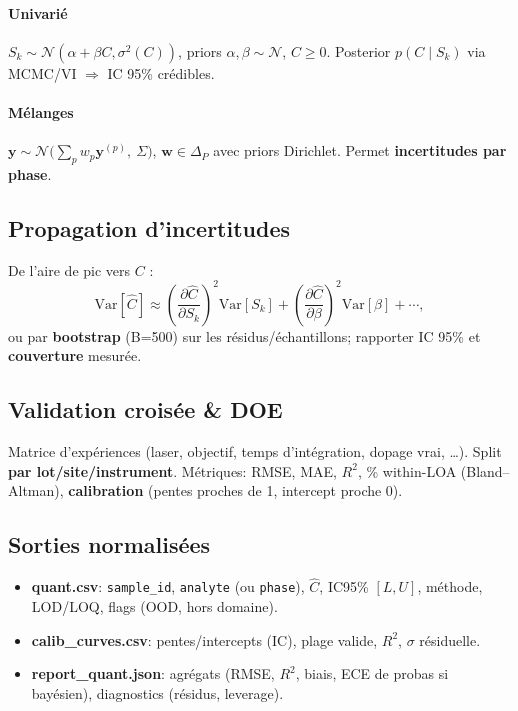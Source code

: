 \paragraph{Univarié} $S_k \sim \mathcal{N}(\alpha + \beta C, \sigma^2(C))$, priors $\alpha,\beta\sim \mathcal{N}$, $C\ge 0$. Posterior $p(C\mid S_k)$ via MCMC/VI $\Rightarrow$ IC 95\% crédibles.
\paragraph{Mélanges} $\mathbf{y}\sim \mathcal{N}\!\big(\sum_p w_p \mathbf{y}^{(p)},\ \Sigma\big)$, $\mathbf{w}\in\Delta_P$ avec priors Dirichlet. Permet \textbf{incertitudes par phase}.

\subsection{Propagation d'incertitudes}
De l'aire de pic vers $C$ :
\begin{equation}
\mathrm{Var}[\hat{C}] \approx \left(\frac{\partial \hat{C}}{\partial S_k}\right)^2 \mathrm{Var}[S_k] + \left(\frac{\partial \hat{C}}{\partial \beta}\right)^2 \mathrm{Var}[\beta] + \cdots,
\end{equation}
ou par \textbf{bootstrap} (B=500) sur les résidus/échantillons; rapporter IC 95\% et \textbf{couverture} mesurée.

\subsection{Validation croisée \& DOE}
Matrice d'expériences (laser, objectif, temps d'intégration, dopage vrai, \ldots). Split \textbf{par lot/site/instrument}. Métriques: RMSE, MAE, $R^2$, \% within-LOA (Bland--Altman), \textbf{calibration} (pentes proches de 1, intercept proche 0).

\subsection{Sorties normalisées}
\begin{itemize}[nosep]
\item \textbf{quant.csv}: \texttt{sample\_id}, \texttt{analyte} (ou \texttt{phase}), $\hat{C}$, IC95\% $[L,U]$, méthode, LOD/LOQ, flags (OOD, hors domaine).
\item \textbf{calib\_curves.csv}: pentes/intercepts (IC), plage valide, $R^2$, $\sigma$ résiduelle.
\item \textbf{report\_quant.json}: agrégats (RMSE, $R^2$, biais, ECE de probas si bayésien), diagnostics (résidus, leverage).
\end{itemize}

